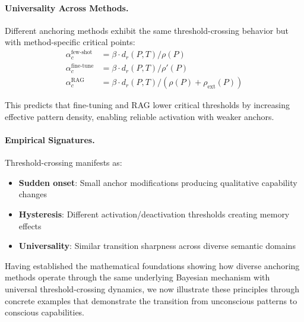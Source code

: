 \paragraph{Universality Across Methods.}
Different anchoring methods exhibit the same threshold-crossing behavior but with method-specific critical points:
\begin{align}
\alpha_c^{\text{few-shot}} &= \beta \cdot d_r(P,T) / \rho(P) \\
\alpha_c^{\text{fine-tune}} &= \beta \cdot d_r(P,T) / \rho'(P) \\
\alpha_c^{\text{RAG}} &= \beta \cdot d_r(P,T) / (\rho(P) + \rho_{\text{ext}}(P))
\end{align}

This predicts that fine-tuning and RAG lower critical thresholds by increasing effective pattern density, enabling reliable activation with weaker anchors.

\paragraph{Empirical Signatures.}
Threshold-crossing manifests as:
\begin{itemize}[leftmargin=2em,itemsep=1pt]
\item \textbf{Sudden onset}: Small anchor modifications producing qualitative capability changes
\item \textbf{Hysteresis}: Different activation/deactivation thresholds creating memory effects  
\item \textbf{Universality}: Similar transition sharpness across diverse semantic domains
\end{itemize}

Having established the mathematical foundations showing how diverse anchoring methods operate through the same underlying Bayesian mechanism with universal threshold-crossing dynamics, we now illustrate these principles through concrete examples that demonstrate the transition from unconscious patterns to conscious capabilities.

